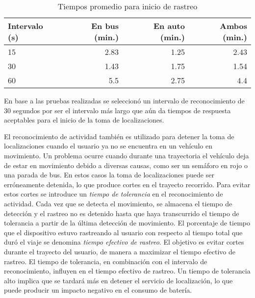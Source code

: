 \begin{table}[h]
  \centering
	\begin{tabular}{lrrr}
	\toprule
	Intervalo (s) & En bus (min.) & En auto (min.) & Ambos (min.) \\
	\midrule
	15            & 2.83         & 1.25          & 2.43           \\
	30            & 1.43         & 1.75          & 1.54           \\
	60            & 5.5          & 2.75          & 4.4            \\
	\bottomrule
	\end{tabular}
  \caption{Tiempos promedio para inicio de rastreo}
  \label{tab:prom_intervalo_reconocimiento}
\end{table}

En base a las pruebas realizadas se seleccionó un intervalo de reconocimiento de 30 segundos por ser el intervalo más largo que aún da tiempos de respuesta aceptables para el inicio de la toma de localizaciones.

El reconocimiento de actividad también es utilizado para detener la toma de localizaciones cuando el usuario ya no se encuentra en un vehículo en movimiento. Un problema ocurre cuando durante una trayectoria el vehículo deja de estar en movimiento debido a diversas causas, como ser un semáforo en rojo o una parada de bus. En estos casos la toma de localizaciones puede ser erróneamente detenida, lo que produce cortes en el trayecto recorrido. Para evitar estos cortes se introduce un \emph{tiempo de tolerancia} en el reconocimiento de actividad. Cada vez que se detecta el movimiento, se almacena el tiempo de detección y el rastreo no es detenido hasta que haya transcurrido el tiempo de tolerancia a partir de la última detección de movimiento. El porcentaje de tiempo que el dispositivo estuvo rastreando al usuario con respecto al tiempo total que duró el viaje se denomina \emph{tiempo efectivo de rastreo}. El objetivo es evitar cortes durante el trayecto del usuario, de manera a maximizar el tiempo efectivo de rastreo. El tiempo de tolerancia, en combinación con el intervalo de reconocimiento, influyen en el tiempo efectivo de rastreo. Un tiempo de tolerancia alto implica que se tardará más en detener el servicio de localización, lo que puede producir un impacto negativo en el consumo de batería.

